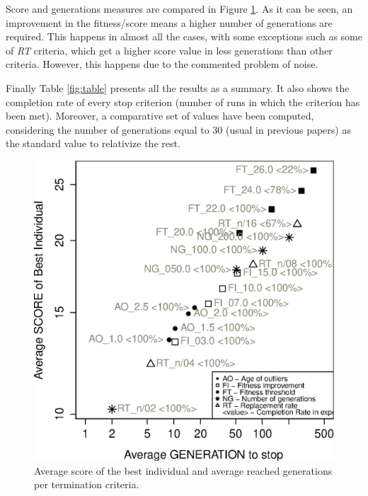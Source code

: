 \documentclass[runningheads,a4paper]{llncs}
\begin{document}
Score and generations measures are compared in Figure \ref{subfig:comparative}. As it can be seen, an improvement in the fitness/score means a higher number of generations are required. This happens in almost all the cases, with some exceptions such as some of \textit{RT} criteria, which get a higher score value in less generations than other criteria. However, this happens due to the commented problem of noise.

Finally Table \ref{fig:table} presents all the results as a summary. It also shows the completion rate of every stop criterion (number of runs in which the criterion has been met). Moreover, a comparative set of values have been computed, considering the number of generations equal to 30 (usual in previous papers) as the standard value to relativize the rest.

\begin{figure}[h!tb]
	\begin{minipage}[b]{.50\columnwidth}
		\includegraphics[width=1\columnwidth]{imags/Comparative-log.eps}
		\caption{Average score of the best individual and average reached generations per termination criteria.}
		\label{subfig:comparative}
		\vfill
		\end{minipage}
\hfill
\begin{minipage}[b]{.44\columnwidth}

\end{minipage}
\end{figure}
\end{document}
